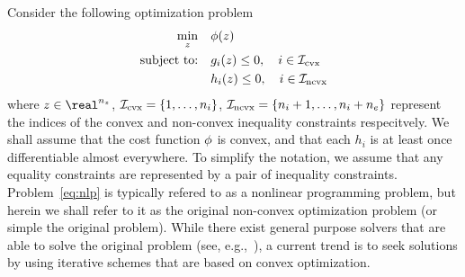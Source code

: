 \documentclass[letterpaper, 10 pt, conference]{ieeeconf}
\begin{document}
Consider the following optimization problem
\begin{subequations}\label{eq:nlp}
\begin{align}
\min_z &\quad \phi(z) \label{eq:nlp_a} \\
\text{subject to:} &\quad g_i(z) \leq 0, \quad i \in \mathcal{I}_{\text{cvx}} \label{eq:nlp_b}\\
&\quad h_i (z) \leq 0, \quad i \in \mathcal{I}_{\text{ncvx}} \label{eq:nlp_c}
\end{align}
\end{subequations}
where $\z\in\real^{\nz}$, $\mathcal{I}_{\text{cvx}} = \{1,\ldots,n_i\}$, $\mathcal{I}_{\text{ncvx}}=\{n_i+1,\ldots,n_i+n_e\}$ represent the indices of the convex and non-convex inequality constraints respecitvely. We shall assume that the cost function $\phi$ is convex, and that each $h_i$ is at least once differentiable almost everywhere. To simplify the notation, we assume that any equality constraints are represented by a pair of inequality constraints. Problem~\eqref{eq:nlp} is typically refered to as a nonlinear programming problem, but herein we shall refer to it as the original non-convex optimization problem (or simple the original problem). While there exist general purpose solvers that are able to solve the original problem (see, e.g.,~\cite{Gill1981,NocedalWright}), a current trend is to seek solutions by using iterative schemes that are based on convex optimization. 
\end{document}
